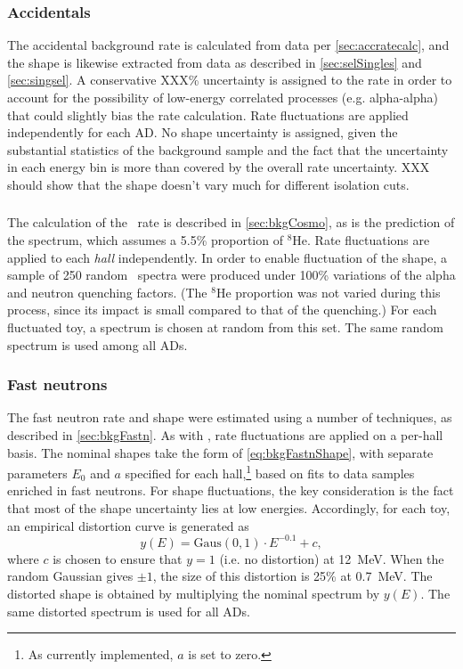 \documentclass[../thesis.tex]{subfiles}
\begin{document}
\subsubsection{Accidentals}

The accidental background rate is calculated from data per \autoref{sec:accratecalc}, and the shape is likewise extracted from data as described in \autoref{sec:selSingles} and \autoref{sec:singsel}. A conservative XXX\% uncertainty is assigned to the rate in order to account for the possibility of low-energy correlated processes (e.g. alpha-alpha) that could slightly bias the rate calculation. Rate fluctuations are applied independently for each AD. No shape uncertainty is assigned, given the substantial statistics of the background sample and the fact that the uncertainty in each energy bin is more than covered by the overall rate uncertainty. XXX should show that the shape doesn't vary much for different isolation cuts.

\subsubsection{\LiHe}

The calculation of the \LiHe\ rate is described in \autoref{sec:bkgCosmo}, as is the prediction of the spectrum, which assumes a 5.5\% proportion of $^8$He. Rate fluctuations are applied to each \emph{hall} independently. In order to enable fluctuation of the shape, a sample of 250 random \LiHe\ spectra were produced under 100\% variations of the alpha and neutron quenching factors. (The $^8$He proportion was not varied during this process, since its impact is small compared to that of the quenching.) For each fluctuated toy, a spectrum is chosen at random from this set. The same random spectrum is used among all ADs.

\subsubsection{Fast neutrons}

The fast neutron rate and shape were estimated using a number of techniques, as described in \autoref{sec:bkgFastn}. As with \LiHe, rate fluctuations are applied on a per-hall basis. The nominal shapes take the form of \autoref{eq:bkgFastnShape}, with separate parameters $E_0$ and $a$ specified for each hall,\footnote{As currently implemented, $a$ is set to zero.} based on fits to data samples enriched in fast neutrons. For shape fluctuations, the key consideration is the fact that most of the shape uncertainty lies at low energies. Accordingly, for each toy, an empirical distortion curve is generated as
\begin{equation*}
  y(E) = \mathrm{Gaus}(0,1) \cdot E^{-0.1} + c,
\end{equation*}
where $c$ is chosen to ensure that $y = 1$ (i.e. no distortion) at 12~MeV. When the random Gaussian gives $\pm 1$, the size of this distortion is 25\% at 0.7~MeV. The distorted shape is obtained by multiplying the nominal spectrum by $y(E)$. The same distorted spectrum is used for all ADs.
\end{document}
